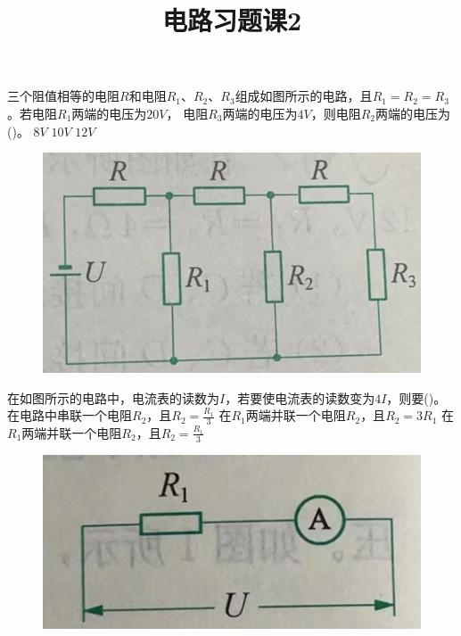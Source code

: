 \documentclass[a4paper,cs4size]{BHCexam}
\title{电路习题课2}
\begin{document}
\maketitle
\begin{groups}

    \begin{questions}[]

        \question[5]三个阻值相等的电阻$R$和电阻$R_1$、$R_2$、$R_3$组成如图所示的电路，且$R_1=R_2=R_3$。若电阻$R_1$两端的电压为$20V$，
        电阻$R_3$两端的电压为$4V$，则电阻$R_2$两端的电压为(\quad\quad\quad)。
        {$8V$}
        {$10V$}
        {$12V$}
        \begin{figure}[htb]
            \flushright
            \includegraphics [scale=0.3,trim=0 0 0 0]{./image/physics_circuit2_1.png}
            \label{fig:fig_circuit2_1}
        \end{figure}
        \vspace{2.5cm}

        \question[5]在如图所示的电路中，电流表的读数为$I$，若要使电流表的读数变为$4I$，则要(\quad\quad\quad)。
        {在电路中串联一个电阻$R_2$，且$R_2=\frac{R_1}{3}$}
        {在$R_1$两端并联一个电阻$R_2$，且$R_2=3R_1$}
        {在$R_1$两端并联一个电阻$R_2$，且$R_2=\frac{R_1}{3}$}
        \begin{figure}[htb]
            \flushright
            \includegraphics [scale=0.4,trim=0 0 0 0]{./image/physics_circuit2_2.png}
            \label{fig:fig_circuit2_2}
        \end{figure}
        \vspace{2.5cm}


\end{questions}
\end{groups}
\end{document}
